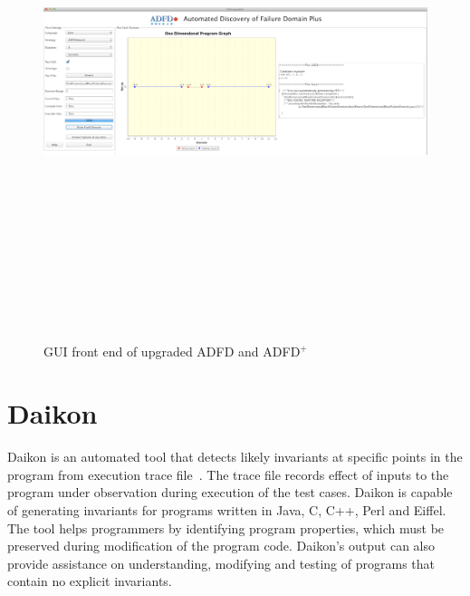 \begin{figure}
\centering
\centerline{\includegraphics[width=22cm,height=15cm]{chapter7/adfdUpgraded1.png}}
\caption{GUI front end of upgraded ADFD and ADFD$^+$}
\label{fig:adfdUpgraded}
\end{figure}



\clearpage
\newpage
\section{Daikon}
Daikon is an automated tool that detects likely invariants at specific points in the program from execution trace file~\cite{ernst2007daikon}. The trace file records effect of inputs to the program under observation during execution of the test cases. Daikon is capable of generating invariants for programs written in Java, C, C++, Perl and Eiffel. The tool helps programmers by identifying program properties, which must be preserved during modification of the program code. Daikon's output can also provide assistance on understanding, modifying and testing of programs that contain no explicit invariants.


